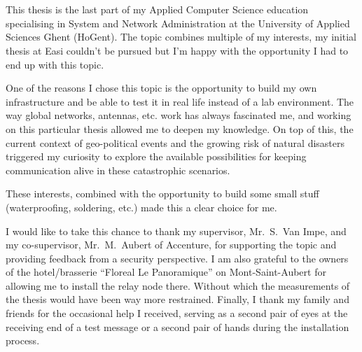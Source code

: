 
\chapter*{}%
\label{ch:voorwoord}
This thesis is the last part of my Applied Computer Science education specialising in System and Network Administration at the University of Applied Sciences Ghent (HoGent).
The topic combines multiple of my interests, my initial thesis at Easi couldn't be pursued but I'm happy with the opportunity I had to end up with this topic.

One of the reasons I chose this topic is the opportunity to build my own infrastructure and be able to test it in real life instead of a lab environment.
The way global networks, antennas, etc. work has always fascinated me, and working on this particular thesis allowed me to deepen my knowledge.
On top of this, the current context of geo-political events and the growing risk of natural disasters triggered my curiosity to explore the available possibilities for keeping communication alive in these catastrophic scenarios.

These interests, combined with the opportunity to build some small stuff (waterproofing, soldering, etc.) made this a clear choice for me.

I would like to take this chance to thank my supervisor, Mr.\ S.\ Van Impe, and my co-supervisor, Mr.\ M.\ Aubert of Accenture, for supporting the topic and providing feedback from a security perspective.
I am also grateful to the owners of the hotel/brasserie ``Floreal Le Panoramique'' on Mont-Saint-Aubert for allowing me to install the relay node there.
Without which the measurements of the thesis would have been way more restrained.
Finally, I thank my family and friends for the occasional help I received, serving as a second pair of eyes at the receiving end of a test message or a second pair of hands during the installation process.